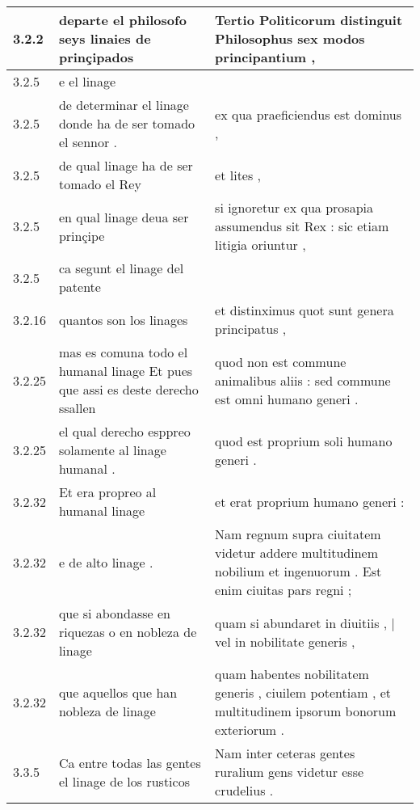 \begin{tabular}{|p{1cm}|p{6.5cm}|p{6.5cm}|}
3.2.2 & departe el philosofo seys linaies de prinçipados & Tertio Politicorum distinguit Philosophus sex modos principantium , \\\hline
3.2.5 & e el linage &  \\\hline
3.2.5 & de determinar el linage donde ha de ser tomado el sennor . & ex qua praeficiendus est dominus , \\\hline
3.2.5 & de qual linage ha de ser tomado el Rey & et lites , \\\hline
3.2.5 & en qual linage deua ser prinçipe & si ignoretur ex qua prosapia assumendus sit Rex : sic etiam litigia oriuntur , \\\hline
3.2.5 & ca segunt el linage del patente &  \\\hline
3.2.16 & quantos son los linages & et distinximus quot sunt genera principatus , \\\hline
3.2.25 & mas es comuna todo el humanal linage Et pues que assi es deste derecho ssallen & quod non est commune animalibus aliis : sed commune est omni humano generi . \\\hline
3.2.25 & el qual derecho esppreo solamente al linage humanal . & quod est proprium soli humano generi . \\\hline
3.2.32 & Et era propreo al humanal linage & et erat proprium humano generi : \\\hline
3.2.32 & e de alto linage . & Nam regnum supra ciuitatem videtur addere multitudinem nobilium et ingenuorum . Est enim ciuitas pars regni ; \\\hline
3.2.32 & que si abondasse en riquezas o en nobleza de linage & quam si abundaret in diuitiis , | vel in nobilitate generis , \\\hline
3.2.32 & que aquellos que han nobleza de linage & quam habentes nobilitatem generis , ciuilem potentiam , et multitudinem ipsorum bonorum exteriorum . \\\hline
3.3.5 & Ca entre todas las gentes el linage de los rusticos & Nam inter ceteras gentes ruralium gens videtur esse crudelius . \\\hline

\end{tabular}
